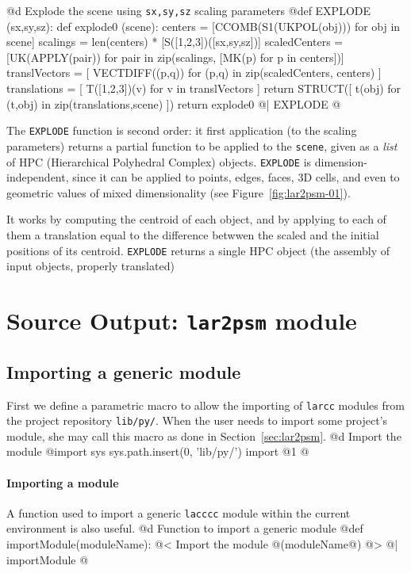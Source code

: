 \documentclass[11pt,oneside]{article}	%
\begin{document}
@d Explode the scene using \texttt{sx,sy,sz} scaling parameters
@{def EXPLODE (sx,sy,sz):
    def explode0 (scene):
        centers = [CCOMB(S1(UKPOL(obj))) for obj in scene]
        scalings = len(centers) * [S([1,2,3])([sx,sy,sz])]
        scaledCenters = [UK(APPLY(pair)) for pair in
                         zip(scalings, [MK(p) for p in centers])]
        translVectors = [ VECTDIFF((p,q)) for (p,q) in zip(scaledCenters, centers) ]
        translations = [ T([1,2,3])(v) for v in translVectors ]
        return STRUCT([ t(obj) for (t,obj) in zip(translations,scene) ])
    return explode0  
@| EXPLODE @}

The \texttt{EXPLODE} function is second order: it first application (to the scaling parameters) returns a partial function to be applied to the \texttt{scene}, given as a \emph{list} of HPC (Hierarchical Polyhedral Complex) objects. 
\texttt{EXPLODE} is dimension-independent, since it can be applied to points, edges, faces, 3D cells, and even to geometric values of mixed dimensionality (see Figure~\ref{fig:lar2psm-01}).

It works by computing the centroid of each object, and by applying to each of them a translation equal to the difference betwwen the scaled and the initial positions of its centroid. 
\texttt{EXPLODE}  returns a single HPC object (the assembly of input objects, properly translated)

\section{Source Output: \texttt{lar2psm} module}


\subsection{Importing a generic module}
First we define a parametric macro to allow the importing of \texttt{larcc} modules from the project repository \texttt{lib/py/}. When the user needs to import some project's module, she may call this macro as done in Section~\ref{sec:lar2psm}.
@d Import the module
@{import sys
sys.path.insert(0, 'lib/py/')
import @1
@}

\paragraph{Importing a module} A function used to import a generic \texttt{lacccc} module within the current environment is also useful.
@d Function to import a generic module
@{def importModule(moduleName):
	@< Import the module @(moduleName@) @>
@| importModule @}
\end{document}
